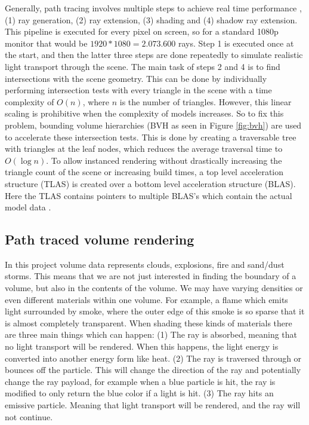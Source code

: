 Generally, path tracing involves multiple steps to achieve real time performance \cite{laine2013megakernels}, (1) ray generation, (2) ray extension, (3) shading and (4) shadow ray extension. This pipeline is executed for every pixel on screen, so for a standard 1080p monitor that would be $1920*1080=2.073.600$ rays. Step 1 is executed once at the start, and then the latter three steps are done repeatedly to simulate realistic light transport through the scene. The main task of steps 2 and 4 is to find intersections with the scene geometry. This can be done by individually performing intersection tests with every triangle in the scene with a time complexity of $O(n)$, where $n$ is the number of triangles. However, this linear scaling is prohibitive when the complexity of models increases. So to fix this problem, bounding volume hierarchies (BVH as seen in Figure \ref{fig:bvh}) are used to accelerate these intersection tests. This is done by creating a traversable tree with triangles at the leaf nodes, which reduces the average traversal time to  $O(\log n)$. To allow instanced rendering without drastically increasing the triangle count of the scene or increasing build times, a top level acceleration structure (TLAS) is created over a bottom level acceleration structure (BLAS). Here the TLAS contains pointers to multiple BLAS's which contain the actual model data \cite{VulkanAccelerationStructures}.



\clearpage\subsection{Path traced volume rendering} \label{related_work:path_traced_volume_rendering}
In this project volume data represents clouds, explosions, fire and sand/dust storms. This means that we are not just interested in finding the boundary of a volume, but also in the contents of the volume. We may have varying densities or even different materials within one volume. For example, a flame which emits light surrounded by smoke, where the outer edge of this smoke is so sparse that it is almost completely transparent. When shading these kinds of materials there are three main things which can happen: (1) The ray is absorbed, meaning that no light transport will be rendered. When this happens, the light energy is converted into another energy form like heat. (2) The ray is traversed through or bounces off the particle. This will change the direction of the ray and potentially change the ray payload, for example when a blue particle is hit, the ray is modified to only return the blue color if a light is hit. (3) The ray hits an emissive particle. Meaning that light transport will be rendered, and the ray will not continue.

